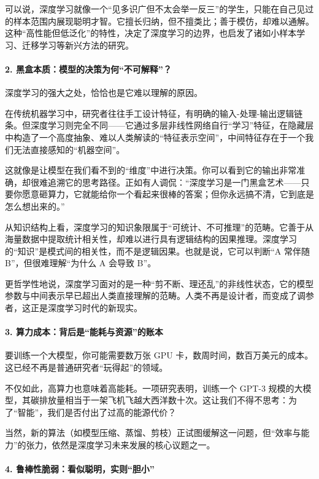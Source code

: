 可以说，深度学习就像一个“见多识广但不太会举一反三”的学生，只能在自己见过的样本范围内展现聪明才智。它擅长归纳，但不擅类比；善于模仿，却难以通解。这种“高性能但低泛化”的特性，决定了深度学习的边界，也启发了诸如小样本学习、迁移学习等新兴方法的研究。

\paragraph*{2. 黑盒本质：模型的决策为何“不可解释”？}

深度学习的强大之处，恰恰也是它难以理解的原因。

在传统机器学习中，研究者往往手工设计特征，有明确的输入-处理-输出逻辑链条。但深度学习则完全不同——它通过多层非线性网络自行“学习”特征，在隐藏层中构造了一个高度抽象、难以人类解读的“特征表示空间”，中间特征存在于一个我们无法直接感知的“机器空间”。

这就像是让模型在我们看不到的“维度”中进行决策。你可以看到它的输出非常准确，却很难追溯它的思考路径。正如有人调侃：“深度学习是一门黑盒艺术——只要你愿意砸算力，它就能给你一个看起来很棒的答案；但你永远搞不清，它到底是怎么想出来的。”

从知识结构上看，深度学习的知识象限属于“可统计、不可推理”的范畴。它善于从海量数据中提取统计相关性，却难以进行具有逻辑结构的因果推理。深度学习的“知识”是模式间的相关性，而不是逻辑因果。也就是说，它可以判断“A 常伴随 B”，但很难理解“为什么 A 会导致 B”。

更哲学性地说，深度学习面对的是一种“剪不断、理还乱”的非线性状态，它的模型参数与中间表示早已超出人类直接理解的范畴。人类不再是设计者，而变成了调参者，这正是深度学习时代的新现实。

\paragraph*{3. 算力成本：背后是“能耗与资源”的账本}

要训练一个大模型，你可能需要数万张 GPU 卡，数周时间，数百万美元的成本。这已经不再是普通研究者“玩得起”的领域。

不仅如此，高算力也意味着高能耗。一项研究表明，训练一个 GPT-3 规模的大模型，其碳排放量相当于一架飞机飞越大西洋数十次。这让我们不得不思考：为了“智能”，我们是否付出了过高的能源代价？

当然，新的算法（如模型压缩、蒸馏、剪枝）正试图缓解这一问题，但“效率与能力”的张力，依然是深度学习未来发展的核心议题之一。

\paragraph*{4. 鲁棒性脆弱：看似聪明，实则“胆小”}

